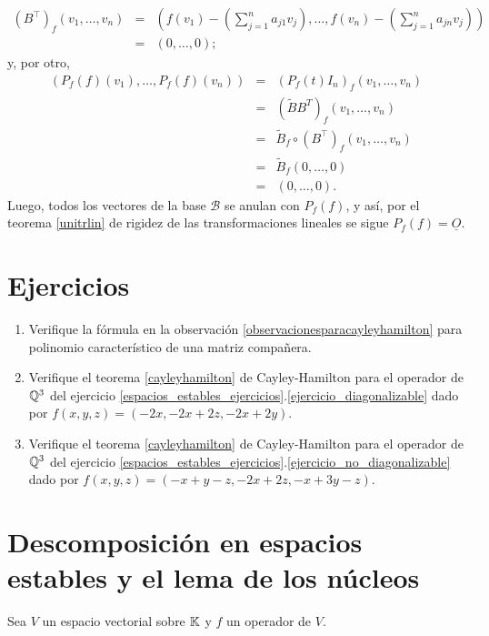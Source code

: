 \begin{obs}
\begin{eqnarray*}
\left(B^\intercal\right)_f(v_1,\ldots, v_n)& = & \left(f(v_1)-\left(\sum_{j=1}^na_{j1}v_j\right),\ldots, f(v_n)-\left(\sum_{j=1}^na_{jn}v_j\right)\right)\\
   & = & \left(0,\ldots, 0\right);
\end{eqnarray*}
y, por otro,
\begin{eqnarray*}
\left(P_f(f)(v_1),\ldots, P_f(f)(v_n)\right) & = & \left(P_f(t)I_n\right)_f(v_1,\ldots,v_n)\\
    & = & \left( \tilde{B}B^T \right)_f (v_1,\ldots, v_n)\\
    & = & \tilde{B}_f\circ\left(B^\intercal\right)_f(v_1,\ldots,v_n)\\
    & = & \tilde{B}_f(0,\ldots,0)\\
    & = & (0,\ldots,0).
\end{eqnarray*}
Luego, todos los vectores de la base $\mathcal{B}$ se anulan con $P_f(f)$, y as\'i, por el teorema \ref{unitrlin} de rigidez de las transformaciones lineales se sigue $P_f(f)=\underline{O}$.
\end{obs}

\section*{Ejercicios}
\begin{enumerate}
  \item Verifique la fórmula en la observación \ref{observacionesparacayleyhamilton} para polinomio característico de una matriz compañera.
  \item Verifique el teorema \ref{cayleyhamilton} de Cayley-Hamilton para el operador de $\mathbb{Q}^3$ del ejercicio \ref{espacios_estables_ejercicios}.\ref{ejercicio_diagonalizable} dado por $f(x,y,z)=(-2x,-2x+2z,-2x+2y)$.
  \item Verifique el teorema \ref{cayleyhamilton} de Cayley-Hamilton para el operador de $\mathbb{Q}^3$ del ejercicio \ref{espacios_estables_ejercicios}.\ref{ejercicio_no_diagonalizable} dado por $f(x,y,z)=(-x+y-z,-2x+2z,-x+3y-z)$.
\end{enumerate}

\section{Descomposición en espacios estables y el lema de los núcleos}

Sea $V$ un espacio vectorial sobre $\mathbb{K}$ y $f$ un operador de $V$.

